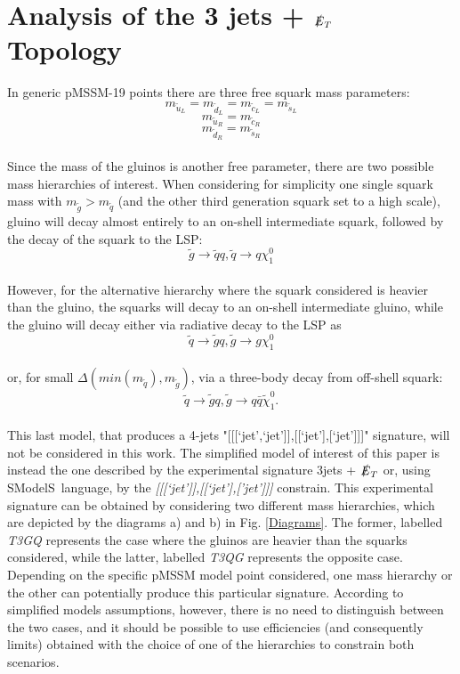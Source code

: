 \documentclass[a4paper,11pt]{article}
\newcommand{\SMO}{{\sc SModelS}}
\begin{document}
\section{Analysis of the 3 jets + $\slashed{E}_T$ Topology}\label{sec::T3GQ}
In generic pMSSM-19 points there are three free squark mass parameters: 
\begin{equation*}
m_{\tilde u_L} = m_{\tilde d_L} = m_{\tilde c_L} = m_{\tilde s_L} 
\end{equation*}
\begin{equation*}
m_{\tilde u_R} = m_{\tilde c_R} 
\end{equation*}
\begin{equation*}
m_{\tilde d_R} = m_{\tilde s_R}
\end{equation*}
\\
Since the mass of the gluinos is another free parameter, there are two possible mass hierarchies of interest. 
When considering for simplicity one single squark mass with $m_{\tilde g} > m_{\tilde q}$ (and the other third generation squark set to a high scale), gluino will decay almost entirely to an on-shell intermediate squark, followed by the decay of the squark to the LSP:
\begin{equation}
\tilde g \rightarrow \tilde q q , \tilde q \rightarrow q \chi_1 ^0
\end{equation}
\\
However, for the alternative hierarchy where the squark considered is heavier than the gluino, the squarks will decay to an on-shell intermediate gluino, while the gluino will decay either via radiative decay to the LSP as 
\begin{equation}
\tilde q \rightarrow \tilde g q , \tilde g \rightarrow g \chi_1 ^0
\end{equation} 
\\
or, for small $\Delta (min(m_{\tilde q}), m_{\tilde g})$,  via a three-body decay from off-shell squark:
\begin{equation}
\tilde q \rightarrow \tilde g q, \tilde g \rightarrow q \bar q \tilde \chi _1 ^0.
 \end{equation}
\\
This last model, that produces a 4-jets "[[[`jet',`jet']],[[`jet'],[`jet']]]" signature, will not be considered in this work. The simplified model of interest of this paper is instead the one described by the experimental signature 3jets + $\slashed{E}_T$ or, using \SMO~language, by the \textit{[[[`jet']],[[`jet'],['jet']]]} constrain. This experimental signature can be obtained by considering two different mass hierarchies, which are depicted by the diagrams a) and b) in Fig. \ref{Diagrams}. The former, labelled \textit{T3GQ} represents the case where the gluinos are heavier than the squarks considered, while the latter, labelled \textit{T3QG} represents the opposite case. Depending on the specific pMSSM model point considered, one mass hierarchy or the other can potentially produce this particular signature. According to simplified models assumptions, however, there is no need to distinguish between the two cases, and it should be possible to use efficiencies (and consequently limits) obtained with the choice of one of the hierarchies to constrain both scenarios. 
\end{document}
